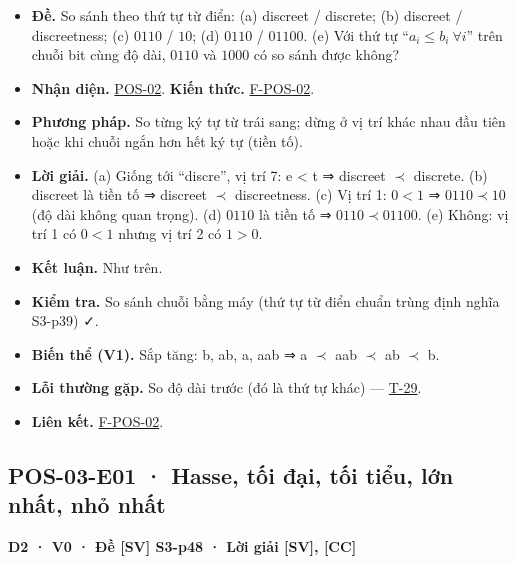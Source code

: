 \documentclass[
  10pt,
  twoside,openany]{book}
\providecommand{\tightlist}{%
  \setlength{\itemsep}{0pt}\setlength{\parskip}{0pt}}
\begin{document}
\begin{itemize}
\tightlist
\item
  \textbf{Đề.} So sánh theo thứ tự từ điển: (a) discreet / discrete; (b)
  discreet / discreetness; (c) \(0110\) / \(10\); (d) \(0110\) /
  \(01100\). (e) Với thứ tự ``\(a_i\le b_i\ \forall i\)'' trên chuỗi bit
  cùng độ dài, \(0110\) và \(1000\) có so sánh được không?
\item
  \textbf{Nhận diện.} \protect\hyperlink{POS-02}{POS-02}. \textbf{Kiến
  thức.} \protect\hyperlink{F-POS-02}{F-POS-02}.
\item
  \textbf{Phương pháp.} So từng ký tự từ trái sang; dừng ở vị trí khác
  nhau đầu tiên hoặc khi chuỗi ngắn hơn hết ký tự (tiền tố).
\item
  \textbf{Lời giải.} (a) Giống tới ``discre'', vị trí 7: e \textless{} t
  ⇒ discreet \(\prec\) discrete. (b) discreet là tiền tố ⇒ discreet
  \(\prec\) discreetness. (c) Vị trí 1: \(0<1\) ⇒ \(0110\prec10\) (độ
  dài không quan trọng). (d) \(0110\) là tiền tố ⇒ \(0110\prec01100\).
  (e) Không: vị trí 1 có \(0<1\) nhưng vị trí 2 có \(1>0\).
\item
  \textbf{Kết luận.} Như trên.
\item
  \textbf{Kiểm tra.} So sánh chuỗi bằng máy (thứ tự từ điển chuẩn trùng
  định nghĩa S3-p39) ✓.
\item
  \textbf{Biến thể (V1).} Sắp tăng: b, ab, a, aab ⇒ a \(\prec\) aab
  \(\prec\) ab \(\prec\) b.
\item
  \textbf{Lỗi thường gặp.} So độ dài trước (đó là thứ tự khác) ---
  \protect\hyperlink{T-29}{T-29}.
\item
  \textbf{Liên kết.} \protect\hyperlink{F-POS-02}{F-POS-02}.
\end{itemize}

\hypertarget{POS-03-E01}{%
\subsection{POS-03-E01 · Hasse, tối đại, tối tiểu, lớn nhất, nhỏ
nhất}\label{POS-03-E01}}

\textbf{D2 · V0 · Đề {[}SV{]} S3-p48 · Lời giải {[}SV{]}, {[}CC{]}}
\end{document}
